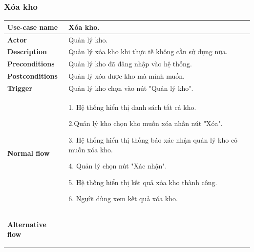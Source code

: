         \subsubsection{Xóa kho}
            \begin{longtable}{| p{} | p{} |} 
                \hline
                 \textbf{Use-case name} 
                & 
                Xóa kho.
                \\
                \hline
                \textbf{Actor} 
                & 
                Quản lý kho.
                \\
                \hline
                \textbf{Description} 
                & 
                Quản lý xóa kho khi thực tế không cần sử dụng nữa.
                \\
                \hline
                 \textbf{Preconditions} 
                &
                Quản lý kho đã đăng nhập vào hệ thống.
                \\
                \hline
                \textbf{Postconditions} 
                & 
                Quản lý xóa được kho mà mình muốn.
                \\
                \hline
                \textbf{Trigger} 
                & 
                Quản lý kho chọn vào nút "Quản lý kho".
                \\
                \hline
                \begin{flushleft}
                 \textbf{Normal flow}
                \end{flushleft}
                & 
                1. Hệ thống hiển thị danh sách tất cả kho.
                    
                    2.Quản lý kho chọn kho muốn xóa nhấn nút "Xóa".
                    
                    3. Hệ thống hiển thị thống báo xác nhận quản lý kho có muốn xóa kho.
                    
                    4. Quản lý chọn nút "Xác nhận".
                    
                    5. Hệ thống hiển thị kết quả xóa kho thành công.
                    
                    6. Người dùng xem kết quả xóa kho.
                \\
                \hline
                \begin{flushleft}
                    \textbf{Alternative flow}
                    

\end{flushleft}
\end{longtable}
